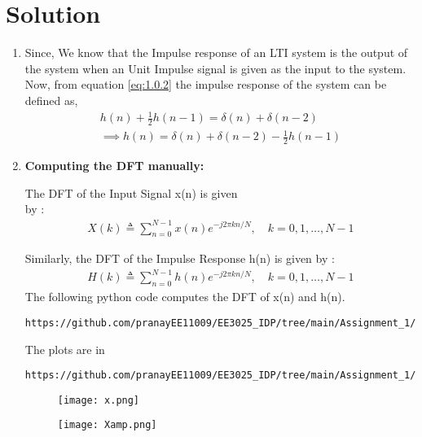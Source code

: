 \documentclass[journal,12pt,twocolumn]{IEEEtran}
\renewcommand\thesection{\arabic{section}}
\begin{document}
\section{Solution}
\begin{enumerate}[label=\thesection.\arabic*.,ref=\thesection.\theenumi]
\item
Since, We know that the Impulse response of an LTI system is the output of the system
when an Unit Impulse signal is given as the input to the system.\\

Now, from  equation \eqref{eq:1.0.2} the impulse response of the system can be defined as,
\begin{align}
    h(n) + \frac{1}{2}h(n-1) = \delta(n) + \delta(n-2)	
    \\
    \implies h(n) = \delta(n) + \delta(n-2) - \frac{1}{2}h(n-1) \label{eq:hn}
\end{align}

\item
{ \bf Computing the DFT manually:} 

The DFT of the Input Signal x(n) is given \\
by :
\begin{align}
    X(k) \triangleq \sum_{n=0}^{N-1}x(n)e^{-j2\pi kn/N},\quad k=0,1, \ldots, N-1 
\end{align}

Similarly, the DFT of the Impulse Response h(n) is given by :
\begin{align}
    H(k) \triangleq \sum_{n=0}^{N-1}h(n)e^{-j2\pi kn/N},\quad k=0,1, \ldots, N-1 
\end{align}
The following python code computes the DFT of x(n) and h(n).
\begin{lstlisting}
https://github.com/pranayEE11009/EE3025_IDP/tree/main/Assignment_1/codes
\end{lstlisting}
The plots are in
\begin{lstlisting}
https://github.com/pranayEE11009/EE3025_IDP/tree/main/Assignment_1/figs
\end{lstlisting}

\newpage

\begin{figure}[h!]
    \centering
    \texttt{[image: x.png]}
    \label{figs}
\end{figure}

\begin{figure}[h!]
    \centering
    \texttt{[image: Xamp.png]}
    \label{figs}
\end{figure}


\end{enumerate}
\end{document}
